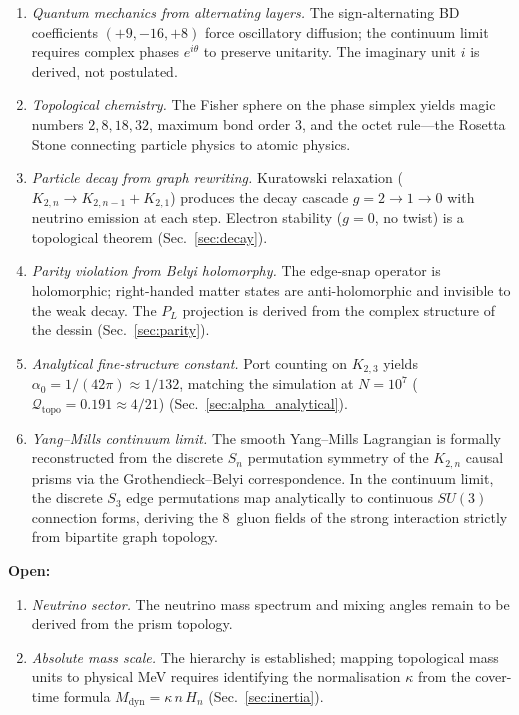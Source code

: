 \documentclass[aps,prd,twocolumn,superscriptaddress,nofootinbib,amsmath,amssymb,longbibliography]{revtex4-2}
\newcommand{\Kbn}{K_{2,n}}
\newcommand{\Qtopo}{\mathcal{Q}_{\mathrm{topo}}}
\begin{document}
\begin{enumerate}[itemsep=1pt,parsep=0pt,topsep=2pt,partopsep=0pt,leftmargin=1.8em]
  \item \emph{Quantum mechanics from alternating layers.}
    The sign-alternating BD coefficients $(+9, -16, +8)$ force
    oscillatory diffusion; the continuum limit requires complex phases
    $e^{i\theta}$ to preserve unitarity.
    The imaginary unit $i$ is derived, not postulated.

  \item \emph{Topological chemistry.}
    The Fisher sphere on the phase simplex yields magic numbers
    $2, 8, 18, 32$, maximum bond order 3, and the octet rule---the
    Rosetta Stone connecting particle physics to atomic physics.

  \item \emph{Particle decay from graph rewriting.}
    Kuratowski relaxation ($K_{2,n} \to K_{2,n-1} + K_{2,1}$)
    produces the decay cascade $g = 2 \to 1 \to 0$ with neutrino
    emission at each step.  Electron stability ($g = 0$, no twist) is
    a topological theorem (Sec.~\ref{sec:decay}).

  \item \emph{Parity violation from Belyi holomorphy.}
    The edge-snap operator is holomorphic; right-handed matter states
    are anti-holomorphic and invisible to the weak decay.  The $P_L$
    projection is derived from the complex structure of the dessin
    (Sec.~\ref{sec:parity}).

  \item \emph{Analytical fine-structure constant.}
    Port counting on $K_{2,3}$ yields
    $\alpha_0 = 1/(42\pi) \approx 1/132$, matching the simulation at
    $N = 10^7$ ($\Qtopo = 0.191 \approx 4/21$)
    (Sec.~\ref{sec:alpha_analytical}).

  \item \emph{Yang--Mills continuum limit.}
    The smooth Yang--Mills Lagrangian is formally reconstructed from
    the discrete $S_n$ permutation symmetry of the $\Kbn$ causal
    prisms via the Grothendieck--Belyi correspondence.  In the
    continuum limit, the discrete $S_3$ edge permutations map
    analytically to continuous $SU(3)$ connection forms, deriving the
    8~gluon fields of the strong interaction strictly from bipartite
    graph topology.
\end{enumerate}

\textbf{Open:}
\begin{enumerate}[itemsep=1pt,parsep=0pt,topsep=2pt,partopsep=0pt,leftmargin=1.8em]
  \item \emph{Neutrino sector.}
    The neutrino mass spectrum and mixing angles remain
    to be derived from the prism topology.

  \item \emph{Absolute mass scale.}
    The hierarchy is established; mapping topological mass units
    to physical MeV requires identifying the normalisation $\kappa$
    from the cover-time formula
    $M_{\mathrm{dyn}} = \kappa\,n\,H_n$ (Sec.~\ref{sec:inertia}).
\end{enumerate}
\end{document}
